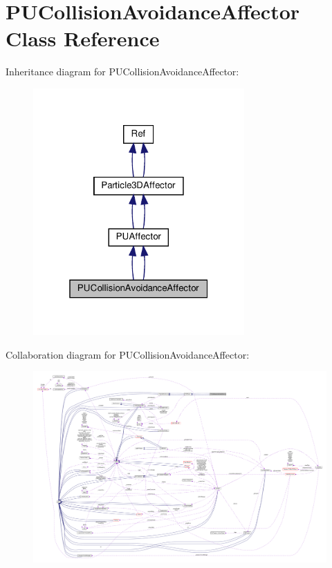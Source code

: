 \hypertarget{classPUCollisionAvoidanceAffector}{}\section{P\+U\+Collision\+Avoidance\+Affector Class Reference}
\label{classPUCollisionAvoidanceAffector}


Inheritance diagram for P\+U\+Collision\+Avoidance\+Affector\+:
\nopagebreak
\begin{figure}[H]
\begin{center}
\leavevmode
\includegraphics[width=229pt]{classPUCollisionAvoidanceAffector__inherit__graph}
\end{center}
\end{figure}


Collaboration diagram for P\+U\+Collision\+Avoidance\+Affector\+:
\nopagebreak
\begin{figure}[H]
\begin{center}
\leavevmode
\includegraphics[width=350pt]{classPUCollisionAvoidanceAffector__coll__graph}
\end{center}
\end{figure}
